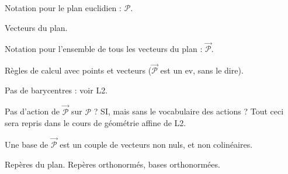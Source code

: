 Notation pour le plan euclidien : $\mathcal P$.

Vecteurs du plan.

Notation pour l'ensemble de tous les vecteurs du plan : $\overrightarrow{\mathcal P}$.

Règles de calcul avec points et vecteurs ($\overrightarrow{\mathcal P}$ est un ev, sans le dire).

Pas de barycentres : voir L2.

Pas d'action de $\overrightarrow{\mathcal P}$ sur $\mathcal P$ ? SI, mais sans le vocabulaire des actions ?
Tout ceci sera repris dans le cours de géométrie affine de L2.

\begin{definition}
Une base de $\overrightarrow{\mathcal P}$ est un couple de vecteurs non nuls, et non colinéaires.
\end{definition}

Repères du plan. Repères orthonormés, bases orthonormées.